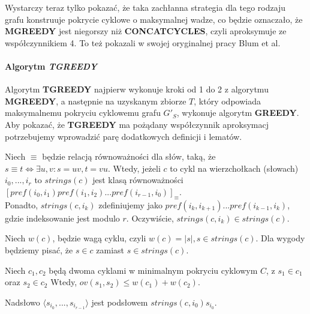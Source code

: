 Wystarczy teraz tylko pokazać, że taka zachłanna strategia dla tego rodzaju grafu konstruuje pokrycie cyklowe o maksymalnej wadze, co będzie oznaczało, że \textbf{MGREEDY} jest niegorszy niż \textbf{CONCATCYCLES}, czyli aproksymuje ze współczynnikiem 4. To też pokazali w swojej oryginalnej pracy Blum et al.

\paragraph{Algorytm \textit{TGREEDY}}

Algorytm \textbf{TGREEDY} najpierw wykonuje kroki od 1 do 2 z algorytmu \textbf{MGREEDY}, a następnie na uzyskanym zbiorze $T$, który odpowiada
maksymalnemu pokryciu cyklowemu grafu $G'_S$, wykonuje algorytm \textbf{GREEDY}. Aby pokazać, że \textbf{TGREEDY} ma pożądany współczynnik aproksymacj potrzebujemy wprowadzić parę dodatkowych definicji i lematów.

\begin{definition}{}{} Niech $\equiv$ będzie relacją równoważności dla słów, taką, że $s \equiv t \Leftrightarrow \exists u,v: s = uv, t = vu$. 
Wtedy, jeżeli $c$ to cykl na wierzchołkach (słowach) $i_0, ..., i_r$ to 
$strings(c)$ jest klasą równoważności $[pref(i_0, i_1)pref(i_1,i_2)...pref(i_{r-1},i_0)]_\equiv$.\\
Ponadto, $strings(c, i_k)$ zdefiniujemy jako
$pref(i_k, i_{k+1})...pref(i_{k-1},i_{k})$, gdzie indeksowanie jest modulo $r$. Oczywiście, $strings(c, i_k) \in strings(c)$.
\end{definition}
\begin{definition}{}{}
Niech $w(c)$, będzie wagą cyklu, czyli $w(c) = |s|, s\in strings(c)$. Dla wygody będziemy pisać, że $s\in c$ zamiast $s\in strings(c)$.
\end{definition}

\begin{lemma}{}{}\label{lemma9}
  Niech $c_1,c_2$ będą dwoma cyklami w minimalnym pokryciu cyklowym $C$, z $s_1\in c_1$ oraz $s_2 \in c_2$ Wtedy, $ov(s_1,s_2) \leq w(c_1) + w(c_2)$. 
\end{lemma}
\begin{lemma}{}{}\label{claim4}
Nadsłowo $\langle s_{i_0},...,s_{i_{r-1}} \rangle $ jest podsłowem $strings(c, i_0)s_{i_0}$.
\end{lemma}

